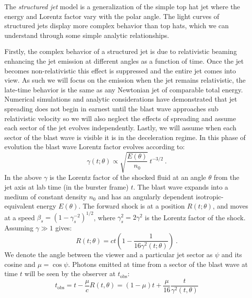 \documentclass[twocolumn]{aastex62}
\newcommand{\tobs}{\ensuremath{t_{\mathrm{obs}}}}
\begin{document}
  The \emph{structured jet} model is a generalization of the simple top hat jet where the energy and Lorentz factor vary with the polar angle.  The light curves of structured jets display more complex behavior than top hats, which we can understand through some simple analytic relationships.
  
  Firstly, the complex behavior of a structured jet is due to relativistic beaming enhancing the jet emission at different angles as a function of time.  Once the jet becomes non-relativistic this effect is suppressed and the entire jet comes into view.  As such we will focus on the emission when the jet remains relativistic, the late-time behavior is the same as any Newtonian jet of comparable total energy.  Numerical simulations and analytic considerations have demonstrated that jet spreading does not begin in earnest until the blast wave approaches sub relativistic velocity so we will also neglect the effects of spreading and assume each sector of the jet evolves independently.  Lastly, we will assume when each sector of the blast wave is visible it is in the deceleration regime.  In this phase of evolution the blast wave Lorentz factor evolves according to:
  \begin{equation}
	\gamma(t; \theta) \propto \sqrt{\frac{E(\theta)}{n_0}}\ t^{-3/2}\ . \label{eq:lorentzEvolution}
\end{equation}
  In the above $\gamma$ is the Lorentz factor of the shocked fluid at an angle $\theta$ from the jet axis at lab time (in the burster frame) $t$.  The blast wave expands into a medium of constant density $n_0$ and has an angularly dependent isotropic-equivalent energy $E(\theta)$.  The forward shock is at a position $R(t; \theta)$, and moves at a speed $\beta_s = (1-\gamma_s^{-2})^{1/2}$, where $\gamma_s^2 = 2 \gamma^2$ is the Lorentz factor of the shock.  Assuming $\gamma \gg 1$ gives:
\begin{equation}
	R(t; \theta) = ct\left(1-\frac{1}{16 \gamma^2(t; \theta)}\right)\ .
\end{equation}
We denote the angle between the viewer and a particular jet sector as $\psi$ and its cosine and $\mu = \cos \psi$.  Photons emitted at time from a sector of the blast wave at time $t$ will be seen by the observer at $\tobs$:
\begin{equation}
	\tobs = t - \frac{\mu}{c} R(t,\theta) = (1-\mu)t + \frac{\mu}{16}\frac{t}{ \gamma^2(t,\theta)} \label{eq:tobs}
\end{equation}
\end{document}
